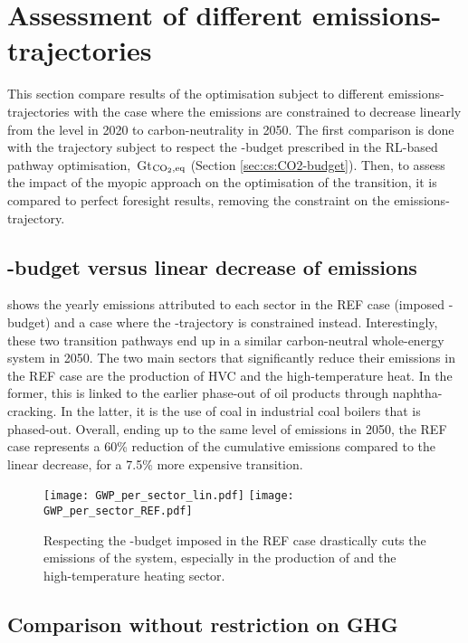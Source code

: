 \section{Assessment of different emissions-trajectories}
\label{app:CO2_trajectories}
This section compare results of the optimisation subject to different emissions-trajectories with the case where the emissions are constrained to decrease linearly from the level in 2020 to carbon-neutrality in 2050. The first comparison is done with the trajectory subject to respect the -budget prescribed in the \gls{RL}-based pathway optimisation, \,Gt$_{\ce{CO2},\text{eq}}$ (Section \ref{sec:cs:CO2-budget}). Then, to assess the impact of the myopic approach on the optimisation of the transition, it is compared to perfect foresight results, removing the constraint on the emissions-trajectory.


\subsection{-budget versus linear decrease of emissions}
\label{app:CO2_budget}

 shows the yearly emissions attributed to each sector in the REF case (\ie imposed -budget) and a case where the -trajectory is constrained instead. Interestingly, these two transition pathways end up in a similar carbon-neutral whole-energy system in 2050. The two main sectors that significantly reduce their emissions in the REF case are the production of \gls{HVC} and the high-temperature heat. In the former, this is linked to the earlier phase-out of oil products through naphtha-cracking. In the latter, it is the use of coal in industrial coal boilers that is phased-out. Overall, ending up to the same level of emissions in 2050, the REF case represents a 60\% reduction of the cumulative emissions compared to the linear decrease, for a 7.5\% more expensive transition.

\begin{figure}[htbp!]
\centering
\texttt{[image: GWP\_per\_sector\_lin.pdf]}
\texttt{[image: GWP\_per\_sector\_REF.pdf]}
\caption{Respecting the -budget imposed in the REF case drastically cuts the emissions of the system, especially in the production of  and the high-temperature heating sector.}
\label{fig:app_CO2_REF_lin}
\end{figure}

\subsection{Comparison without restriction on \gls{GHG}}
\label{app:pfmomy_comparison_without_GHG}

